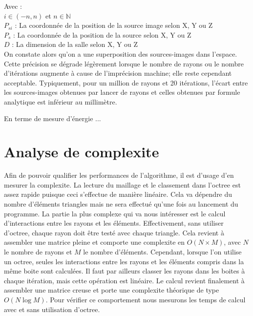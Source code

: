 Avec : \\
$i \in (-n, n)$ et $n \in \mathbb{N}$ \\
$P_{si}$ : La coordonnée de la position de la source image selon X, Y ou Z \\
$P_s$ : La coordonnée de la position de la source selon X, Y ou Z \\
$D$ : La dimension de la salle selon X, Y ou Z \\

On constate alors qu'on a une superposition des sources-images dans l'espace. Cette précision se dégrade légèrement lorsque le nombre de rayons ou le nombre d'itérations augmente à cause de l'imprécision machine; elle reste cependant acceptable. Typiquement, pour un million de rayons et 20 itérations, l'écart entre les sources-images obtenues par lancer de rayons et celles obtenues par formule analytique est inférieur au millimètre.

En terme de mesure d'énergie ...
		
\section{Analyse de \gls{complexite}} \label{complexite}

Afin de pouvoir qualifier les performances de l'algorithme, il est d'usage d'en mesurer la \gls{complexite}. La lecture du maillage et le classement dans l'\gls{octree} est assez rapide puisque ceci s'effectue de manière linéaire. Cela va dépendre du nombre d'éléments triangles mais ne sera effectué qu'une fois au lancement du programme. La partie la plus complexe qui va nous intéresser est le calcul d'interactions entre les rayons et les éléments. Effectivement, sans utiliser d'\gls{octree}, chaque rayon doit être testé avec chaque triangle. Cela revient à assembler une matrice pleine et comporte une \gls{complexite} en $O(N \times M)$, avec $N$ le nombre de rayons et $M$ le nombre d'éléments. Cependant, lorsque l'on utilise un \gls{octree}, seules les interactions entre les rayons et les éléments compris dans la même boite sont calculées. Il faut par ailleurs classer les rayons dans les boites à chaque itération, mais cette opération est linéaire. Le calcul revient finalement à assembler une matrice creuse et porte une \gls{complexite} théorique de type $O(N\log{M})$. 
Pour vérifier ce comportement nous mesurons les temps de calcul avec et sans utilisation d'\gls{octree}.


